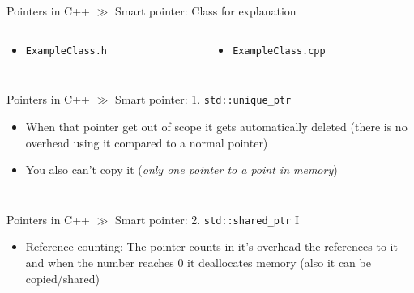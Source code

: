 \documentclass[10pt]{beamer}
\begin{document}
\begin{frame}{Pointers in C++ $\gg$ Smart pointer: Class for explanation}
\begin{columns}
	\begin{column}{0.375\textwidth}
		\begin{itemize}
			\item \texttt{ExampleClass.h}
			\inputminted[bgcolor=lightGreyCustom,fontsize=\scriptsize]{cpp}{./resources/ExampleClass.h}
		\end{itemize}
	\end{column}
	\begin{column}{0.65\textwidth}
		\begin{itemize}
			\item \texttt{ExampleClass.cpp}
			\inputminted[bgcolor=lightGreyCustom,fontsize=\scriptsize]{cpp}{./resources/ExampleClass.cpp}
		\end{itemize}
	\end{column}
\end{columns}
\end{frame}


\begin{frame}{Pointers in C++ $\gg$ Smart pointer: 1.  \texttt{std::unique_ptr}}
\begin{itemize}
	\item When that pointer get out of scope it gets automatically deleted (there is no overhead using it compared to a normal pointer)
	\item You also can't copy it (\textit{only one pointer to a point in memory})
	\inputminted[bgcolor=lightGreyCustom,fontsize=\scriptsize]{cpp}{./resources/unique_ptr.cpp}
	\vspace{-9mm}
	\inputminted[bgcolor=lightGreyCustom,fontsize=\scriptsize]{sh}{./resources/build_unique_ptr.sh}
\end{itemize}
\end{frame}

\begin{frame}{Pointers in C++ $\gg$ Smart pointer: 2.  \texttt{std::shared_ptr} I}
\begin{itemize}
	\item Reference counting: The pointer counts in it's overhead the references to it and when the number reaches $0$ it deallocates memory (also it can be copied/shared)
	\inputminted[bgcolor=lightGreyCustom,fontsize=\scriptsize,lastline=17]{cpp}{./resources/shared_ptr.cpp}
\end{itemize}
\end{frame}
\end{document}
